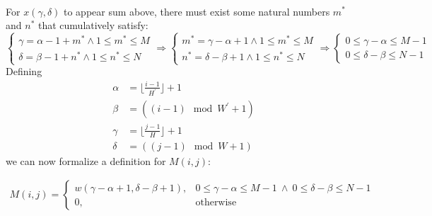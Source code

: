 \begin{questions}
\begin{parts}
\begin{align*}
                 \end{align*}
                 For $x(\gamma, \delta)$ to appear sum above, there must exist some natural numbers $m^{*}$ and $n^{*}$ that cumulatively satisfy: \\
                 \begin{equation*}
                     \begin{cases}
                        \gamma = \alpha - 1 + m^{*} \wedge 1 \le m^{*} \le M \\
                        \delta = \beta - 1 + n^{*} \wedge 1 \le n^{*} \le N
                     \end{cases} \Rightarrow 
                      \begin{cases}
                        m^{*} = \gamma - \alpha + 1  \wedge 1 \le m^{*} \le M \\
                        n^{*} = \delta - \beta + 1 \wedge 1 \le n^{*} \le N
                     \end{cases}  \Rightarrow
                    \begin{cases}
                        0 \le \gamma - \alpha \le M - 1 \\
                        0 \le \delta - \beta \le N - 1
                     \end{cases}
                \end{equation*}
                Defining 
                \begin{align*}
                    \alpha &= \lfloor \frac{i - 1}{H^{\prime}} \rfloor + 1 \\ 
                    \beta &= ((i - 1) \mod W^{\prime} + 1) \\ 
                    \gamma &= \lfloor \frac{j - 1}{H} \rfloor + 1 \\
                    \delta &= ((j - 1) \mod W + 1)
                \end{align*}
                we can now formalize a definition for $M(i, j)$:
                
                \begin{align*}
                    M(i, j) = 
                    \begin{cases}
                        w(\gamma - \alpha + 1, \delta - \beta + 1), & 0 \le \gamma - \alpha \le M - 1 \: \wedge \: 0 \le \delta - \beta \le N - 1 \\
                        0, & \text{otherwise}
                    \end{cases}
                \end{align*}
              

\end{parts}
\end{questions}
